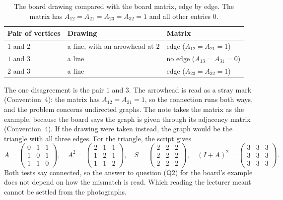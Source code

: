 \begin{table}[ht]
\centering
\caption{The board drawing compared with the board matrix, edge by edge. The matrix has $A_{12}=A_{21}=A_{23}=A_{32}=1$ and all other entries $0$.}\label{tab:mismatch}
\begin{tabular}{@{}lll@{}}
\toprule
Pair of vertices & Drawing & Matrix \\
\midrule
$1$ and $2$ & a line, with an arrowhead at $2$ & edge ($A_{12}=A_{21}=1$) \\
$1$ and $3$ & a line & no edge ($A_{13}=A_{31}=0$) \\
$2$ and $3$ & a line & edge ($A_{23}=A_{32}=1$) \\
\bottomrule
\end{tabular}
\end{table}

The one disagreement is the pair $1$ and $3$. The arrowhead is read as a stray mark (Convention~4): the matrix has $A_{12}=A_{21}=1$, so the connection runs both ways, and the problem concerns undirected graphs. The note takes the matrix as the example, because the board says the graph is given through its adjacency matrix (Convention~4). If the drawing were taken instead, the graph would be the triangle with all three edges. For the triangle, the script gives
\[
A=\begin{pmatrix}0&1&1\\1&0&1\\1&1&0\end{pmatrix},\quad
A^2=\begin{pmatrix}2&1&1\\1&2&1\\1&1&2\end{pmatrix},\quad
S=\begin{pmatrix}2&2&2\\2&2&2\\2&2&2\end{pmatrix},\quad
(I+A)^2=\begin{pmatrix}3&3&3\\3&3&3\\3&3&3\end{pmatrix}.
\]
Both tests say connected, so the answer to question (Q2) for the board's example does not depend on how the mismatch is read. Which reading the lecturer meant cannot be settled from the photographs.
